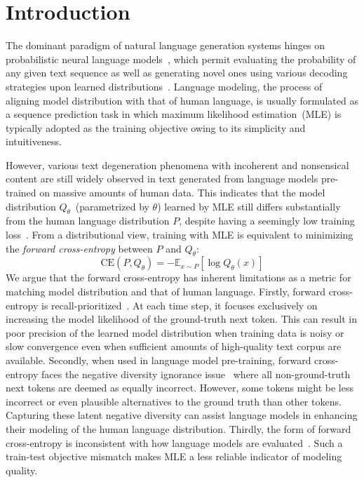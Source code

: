 \section{Introduction}
The dominant paradigm of natural language generation systems hinges on probabilistic neural language models~\citep{gpt2,opt}, which permit evaluating the probability of any given text sequence as well as generating novel ones using various decoding strategies upon learned distributions~\citep{topp,meister2023locally}.
Language modeling, the process of aligning model distribution with that of human language, is usually formulated as a sequence prediction task in which maximum likelihood estimation~(MLE) is typically adopted as the training objective owing to its simplicity and intuitiveness.

However, various text degeneration phenomena with incoherent and nonsensical~\citep{lebrun2021evaluating,topp} content are still widely observed in text generated from language models pre-trained on massive amounts of human data. This indicates that the model distribution $Q_{\theta}$~(parametrized by $\theta$) 
learned by MLE still differs substantially from the human language distribution $P$, despite having a seemingly low training loss~\citep{meister2023locally}. From a distributional view, training with MLE is equivalent to minimizing the \textit{forward cross-entropy} between $P$ and $Q_\theta$:
\begin{equation}
    \text{CE}(P, Q_{\theta})=-\mathbb{E}_{x\sim P}[\log{Q_{\theta}(x)}]
\end{equation}
We argue that the forward cross-entropy has inherent limitations as a metric for matching model distribution and that of human language. Firstly, forward cross-entropy is recall-prioritized~\citep{meister-etal-2023-efficacy}. At each time step, it focuses exclusively on increasing the model likelihood of the ground-truth next token. This can result in poor precision of the learned model distribution when training data is noisy or slow convergence even when sufficient amounts of high-quality text corpus are available. Secondly, when used in language model pre-training, forward cross-entropy faces the negative diversity ignorance issue~\citep{li2019data} where all non-ground-truth next tokens are deemed as equally incorrect. However, some tokens might be less incorrect or even plausible alternatives to the ground truth than other 
tokens. Capturing these latent negative diversity can assist language models in enhancing their modeling of the human language distribution. Thirdly, the form of forward cross-entropy is inconsistent with how language models are evaluated~\citep{pang2020text}. Such a train-test objective mismatch makes MLE a less reliable indicator of modeling quality.

